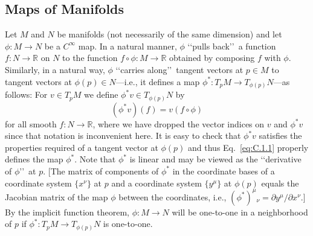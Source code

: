 
\subsection{Maps of Manifolds}\label{sec:C.1}

Let \(M\) and \(N\) be manifolds (not necessarily of the same dimension) and let
\(\phi:M\to N\) be a \(C^\infty\) map. In a natural manner, \(\phi\) \lq\lq pulls
back\rq\rq\ a function \(f:N\to\mathbb R\) on \(N\) to the function
\(f\circ\phi:M\to\mathbb R\) obtained by composing \(f\) with \(\phi\). Similarly,
in a natural way, \(\phi\) \lq\lq carries along\rq\rq\ tangent vectors at \(p\in M\)
to tangent vectors at \(\phi(p)\in N\)---i.e., it defines a map
\(\phi^*:T_pM\to T_{\phi(p)}N\)---as follows: For \(v\in T_pM\) we define
\(\phi^*v\in T_{\phi(p)}N\) by
\begin{equation}
  (\phi^*v)(f)=v(f\circ\phi)
  \tag{C.1.1}\label{eq:C.1.1}
\end{equation}
for all smooth \(f:N\to\mathbb R\), where we have dropped the vector indices on
\(v\) and \(\phi^*v\) since that notation is inconvenient here. It is easy to check
that \(\phi^*v\) satisfies the properties required of a tangent vector at \(\phi(p)\)
and thus Eq.~\eqref{eq:C.1.1} properly defines the map \(\phi^*\). Note that
\(\phi^*\) is linear and may be viewed as the \lq\lq derivative of \(\phi\)\rq\rq\
at \(p\). [The matrix of components of \(\phi^*\) in the coordinate bases of a
coordinate system \(\{x^\nu\}\) at \(p\) and a coordinate system \(\{y^\mu\}\) at
\(\phi(p)\) equals the Jacobian matrix of the map \(\phi\) between the coordinates,
i.e., \((\phi^*)^\mu{}_\nu=\partial y^\mu/\partial x^\nu\).] By the implicit
function theorem, \(\phi:M\to N\) will be one-to-one in a neighborhood of \(p\) if
\(\phi^*:T_pM\to T_{\phi(p)}N\) is one-to-one.

